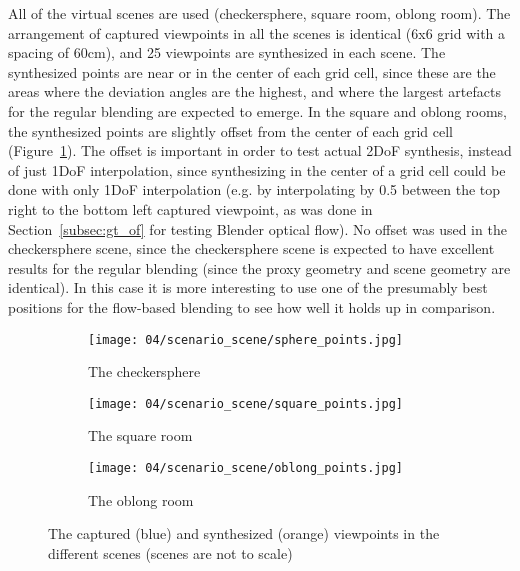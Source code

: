 All of the virtual scenes are used (checkersphere, square room, oblong room). The arrangement of captured viewpoints in all the scenes is identical (6x6 grid with a spacing of 60cm), and 25 viewpoints are synthesized in each scene.
The synthesized points are near or in the center of each grid cell, since these are the areas where the deviation angles are the highest, and where the largest artefacts for the regular blending are expected to emerge. In the square and oblong rooms, the synthesized points are slightly offset from the center of each grid cell (Figure~\ref{fig:scene_setup}). The offset is important in order to test actual 2DoF synthesis, instead of just 1DoF interpolation, since synthesizing in the center of a grid cell could be done with only 1DoF interpolation (e.g. by interpolating by 0.5 between the top right to the bottom left captured viewpoint, as was done in Section~\ref{subsec:gt_of} for testing Blender optical flow). No offset was used in the checkersphere scene, since the checkersphere scene is expected to have excellent results for the regular blending (since the proxy geometry and scene geometry are identical). In this case it is more interesting to use one of the presumably best positions for the flow-based blending to see how well it holds up in comparison.

\begin{figure}
\centering
    \hfill
    \begin{subfigure}[b]{0.4\textwidth}
            \centering
            \texttt{[image: 04/scenario\_scene/sphere\_points.jpg]}
            \caption{The checkersphere}
    \end{subfigure}%
    \hfill
    \begin{subfigure}[b]{0.4\textwidth}
            \centering
            \texttt{[image: 04/scenario\_scene/square\_points.jpg]}
            \caption{The square room}
    \end{subfigure}
    \hfill
    \hfill

    \hfill
    \begin{subfigure}[b]{0.4\textwidth}
            \centering
            \texttt{[image: 04/scenario\_scene/oblong\_points.jpg]}
            \caption{The oblong room}
    \end{subfigure}%
    \hfill
    \hfill
  \caption[The captured and synthesized viewpoints in the different scenes]{The captured (blue) and synthesized (orange) viewpoints in the different scenes (scenes are not to scale)} \label{fig:scene_setup}
\end{figure}

